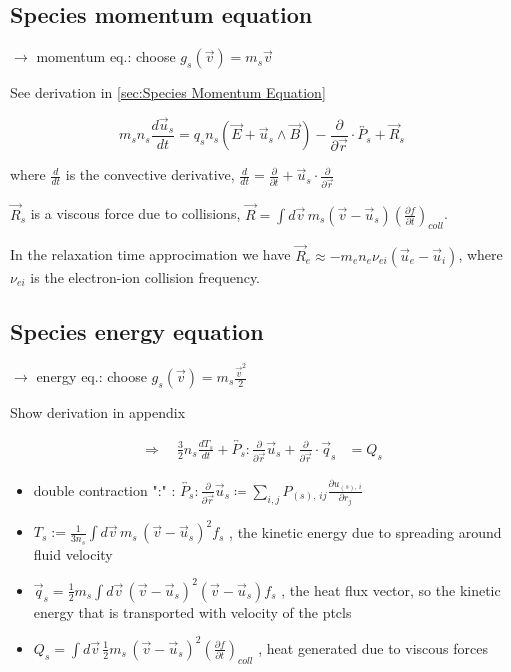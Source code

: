 \subsection{Species momentum equation}
$\to$ momentum eq.: choose $g_s(\vec{v}) = m_s \vec{v}$

See derivation in \ref{sec:Species Momentum Equation}

\begin{equation}\label{eq: species momentum eq}
 m_s n_s \frac{d \vec{u}_s}{d t} = q_s n_s \left(\vec{E} + \vec{u}_s \wedge \vec{B}\right) - \frac{\partial}{\partial \vec{r}} \cdot \overleftrightarrow{P_s} + \vec{R}_s
\end{equation}

where $\frac{d}{dt}$ is the convective derivative, $\frac{d}{dt} = \frac{\partial}{\partial t} + \vec{u}_s \cdot \frac{\partial}{\partial \vec{r}}$

$\vec{R}_s$ is a viscous force due to collisions, $\vec{R} = \int d\vec{v} \, m_s (\vec{v} - \vec{u}_s) \left(\frac{\partial f}{\partial t}\right)_{coll} $.

In the relaxation time approcimation we have $\vec{R}_e \approx -m_e n_e \nu_{ei} (\vec{u}_e - \vec{u}_i)$,
 where $\nu_{ei}$ is the electron-ion collision frequency.

\subsection{Species energy equation}
$\to$ energy eq.: choose $g_s(\vec{v}) = m_s \frac{\vec{v}^2}{2}$

{\color{magenta} Show derivation in appendix}


\begin{align*}
\Rightarrow \quad \frac{3}{2} n_s \frac{d T_s}{d t} + \overleftrightarrow{P_s} : \frac{\partial}{\partial \vec{r}} \vec{u}_s + \frac{\partial}{\partial \vec{r}} \cdot \vec{q}_s &= Q_s
\end{align*}

\begin{itemize}
\item double contraction ":" : $\overleftrightarrow{P_s} : \frac{\partial}{\partial \vec{r}} \vec{u}_s \coloneq \sum_{i,j} P_{(s),\, ij} \frac{\partial u_{(s),\, i}}{\partial r_j}$
\item $T_s := \frac{1}{3n_s} \int d\vec{v} \, m_s \, (\vec{v} - \vec{u}_s)^2 f_s$ \quad, \quad the kinetic energy due to spreading around fluid velocity

\item $\vec{q}_s = \frac{1}{2} m_s \int d\vec{v} \, (\vec{v} - \vec{u}_s)^2 (\vec{v} - \vec{u}_s) f_s$ \quad, \quad the heat flux vector, so the kinetic energy that is transported with velocity of the ptcls

\item $Q_s = \int d\vec{v} \, \frac{1}{2} m_s \, (\vec{v} - \vec{u}_s)^2 \left(\frac{\partial f}{\partial t}\right)_{coll}$ \quad, \quad heat generated due to viscous forces
\end{itemize}

